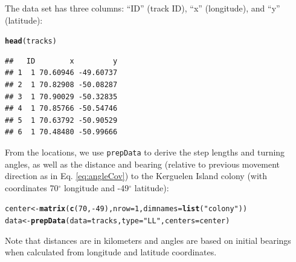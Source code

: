 \documentclass[12pt]{article}\usepackage[]{graphicx}\usepackage[]{xcolor}
\makeatletter
\newcommand{\hlnum}[1]{\textcolor[rgb]{0.686,0.059,0.569}{#1}}%
\newcommand{\hlsng}[1]{\textcolor[rgb]{0.192,0.494,0.8}{#1}}%
\newcommand{\hlopt}[1]{\textcolor[rgb]{0,0,0}{#1}}%
\newcommand{\hldef}[1]{\textcolor[rgb]{0.345,0.345,0.345}{#1}}%
\newcommand{\hlkwb}[1]{\textcolor[rgb]{0.69,0.353,0.396}{#1}}%
\newcommand{\hlkwc}[1]{\textcolor[rgb]{0.333,0.667,0.333}{#1}}%
\newcommand{\hlkwd}[1]{\textcolor[rgb]{0.737,0.353,0.396}{\textbf{#1}}}%
\newenvironment{kframe}{%
 \def\at@end@of@kframe{}%
 \ifinner\ifhmode%
  \def\at@end@of@kframe{\end{minipage}}%
  \begin{minipage}{\columnwidth}%
 \fi\fi%
 \def\FrameCommand##1{\hskip\@totalleftmargin \hskip-\fboxsep
 \colorbox{shadecolor}{##1}\hskip-\fboxsep
     \hskip-\linewidth \hskip-\@totalleftmargin \hskip\columnwidth}%
 \MakeFramed {\advance\hsize-\width
   \@totalleftmargin\z@ \linewidth\hsize
   \@setminipage}}%
 {\par\unskip\endMakeFramed%
 \at@end@of@kframe}
\newenvironment{knitrout}{}{} %
\makeatother
\begin{document}
The data set has three columns: ``ID'' (track ID), ``x'' (longitude), and ``y'' (latitude):

\begin{knitrout}
\color{fgcolor}\begin{kframe}
\begin{alltt}
\hlkwd{head}\hldef{(tracks)}
\end{alltt}
\begin{verbatim}
##   ID        x         y
## 1  1 70.60946 -49.60737
## 2  1 70.82908 -50.08287
## 3  1 70.90029 -50.32835
## 4  1 70.85766 -50.54746
## 5  1 70.63792 -50.90529
## 6  1 70.48480 -50.99666
\end{verbatim}
\end{kframe}
\end{knitrout}

From the locations, we use \verb|prepData| to derive the step lengths and turning angles, as well as the distance and bearing (relative to previous movement direction as in Eq. \ref{eq:angleCov}) to the Kerguelen Island colony (with coordinates 70$^{\circ}$ longitude and -49$^{\circ}$ latitude):
\begin{knitrout}
\color{fgcolor}\begin{kframe}
\begin{alltt}
\hldef{center} \hlkwb{<-} \hlkwd{matrix}\hldef{(}\hlkwd{c}\hldef{(}\hlnum{70}\hldef{,}\hlopt{-}\hlnum{49}\hldef{),}\hlkwc{nrow}\hldef{=}\hlnum{1}\hldef{,}\hlkwc{dimnames}\hldef{=}\hlkwd{list}\hldef{(}\hlsng{"colony"}\hldef{))}
\hldef{data} \hlkwb{<-} \hlkwd{prepData}\hldef{(}\hlkwc{data}\hldef{=tracks,} \hlkwc{type}\hldef{=}\hlsng{"LL"}\hldef{,} \hlkwc{centers}\hldef{=center)}
\end{alltt}
\end{kframe}
\end{knitrout}
Note that distances are in kilometers and angles are based on initial bearings \citep[using geosphere::bearing;][]{Hijmans2016geo} when calculated from longitude and latitude coordinates.  
\end{document}
